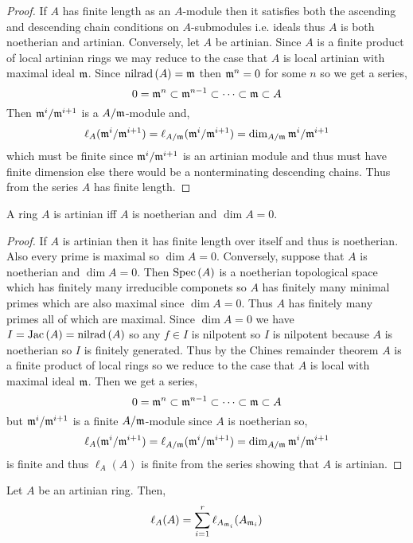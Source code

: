 \documentclass[12pt]{article}
\begin{document}
\begin{proof}
If $A$ has finite length as an $A$-module then it satisfies both the ascending and descending chain conditions on $A$-submodules i.e. ideals thus $A$ is both noetherian and artinian. Conversely, let $A$ be artinian. Since $A$ is a finite product of local artinian rings we may reduce to the case that $A$ is local artinian with maximal ideal $\mathfrak{m}$. Since $\mathrm{nilrad}\left( A \right) = \mathfrak{m}$ then $\mathfrak{m}^n = 0$ for some $n$ so we get a series,
\[ 0 = \mathfrak{m}^n \subset \mathfrak{m}^{n-1} \subset \cdots \subset \mathfrak{m} \subset A \]
Then $\mathfrak{m}^i / \mathfrak{m}^{i+1}$ is a $A / \mathfrak{m}$-module and,
\[ \ell_A(\mathfrak{m}^i / \mathfrak{m}^{i+1}) = \ell_{A/\mathfrak{m}}(\mathfrak{m}^i / \mathfrak{m}^{i+1}) = \dim_{A/\mathfrak{m}} \mathfrak{m}^i / \mathfrak{m}^{i+1} \]
which must be finite since $\mathfrak{m}^i / \mathfrak{m}^{i+1}$ is an artinian module and thus must have finite dimension else there would be a nonterminating descending chains. Thus from the series $A$ has finite length. 
\end{proof}

\begin{theorem}
A ring $A$ is artinian iff $A$ is noetherian and $\dim{A} = 0$.
\end{theorem}

\begin{proof}
If $A$ is artinian then it has finite length over itself and thus is noetherian. Also every prime is maximal so $\dim{A} = 0$. Conversely, suppose that $A$ is noetherian and $\dim{A} = 0$. Then $\mathrm{Spec}\left( A \right)$ is a noetherian topological space which has finitely many irreducible componets so $A$ has finitely many minimal primes which are also maximal since $\dim{A} = 0$. Thus $A$ has finitely many primes all of which are maximal. Since $\dim{A} = 0$ we have $I = \mathrm{Jac}\left( A \right) = \mathrm{nilrad}\left( A \right)$ so any $f \in I$ is nilpotent so $I$ is nilpotent because $A$ is noetherian so $I$ is finitely generated. Thus by the Chines remainder theorem $A$ is a finite product of local rings so we reduce to the case that $A$ is local with maximal ideal $\mathfrak{m}$. Then we get a series,
\[ 0 = \mathfrak{m}^n \subset \mathfrak{m}^{n-1} \subset \cdots \subset \mathfrak{m} \subset A \]
but $\mathfrak{m}^i / \mathfrak{m}^{i+1}$ is a finite $A / \mathfrak{m}$-module since $A$ is noetherian so,
\[ \ell_A(\mathfrak{m}^i / \mathfrak{m}^{i+1}) = \ell_{A/\mathfrak{m}}(\mathfrak{m}^i / \mathfrak{m}^{i+1}) = \dim_{A/\mathfrak{m}} \mathfrak{m}^i / \mathfrak{m}^{i+1} \]
is finite and thus $\ell_A(A)$ is finite from the series showing that $A$ is artinian.
\end{proof}


\begin{prop}
Let $A$ be an artinian ring. Then,
\[ \ell_A(A) = \sum_{i = 1}^r \ell_{A_{\mathfrak{m}_i}}(A_{\mathfrak{m}_i}) \]
\end{prop}
\end{document}
